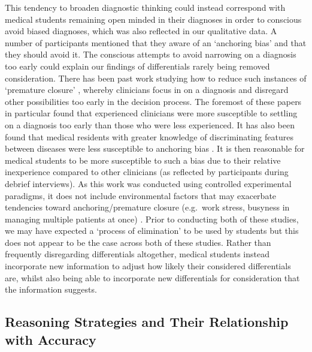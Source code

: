 \documentclass[a4paper, nobind]{templates/ociamthesis}
\begin{document}
This tendency to broaden diagnostic thinking could instead correspond with medical students remaining open minded in their diagnoses in order to conscious avoid biased diagnoses, which was also reflected in our qualitative data. A number of participants mentioned that they aware of an `anchoring bias' and that they should avoid it. The conscious attempts to avoid narrowing on a diagnosis too early could explain our findings of differentials rarely being removed consideration. There has been past work studying how to reduce such instances of `premature closure' \autocite{voytovich_premature_1985,eva_difficulty_2006,krupat_avoiding_2017}, whereby clinicians focus in on a diagnosis and disregard other possibilities too early in the decision process. The foremost of these papers in particular found that experienced clinicians were more susceptible to settling on a diagnosis too early than those who were less experienced. It has also been found that medical residents with greater knowledge of discriminating features between diseases were less susceptible to anchoring bias \autocite{mamede_role_2024}. It is then reasonable for medical students to be more susceptible to such a bias due to their relative inexperience compared to other clinicians (as reflected by participants during debrief interviews). As this work was conducted using controlled experimental paradigms, it does not include environmental factors that may exacerbate tendencies toward anchoring/premature closure (e.g.~work stress, busyness in managing multiple patients at once) \autocite{gupta_associations_2023}. Prior to conducting both of these studies, we may have expected a `process of elimination' to be used by students but this does not appear to be the case across both of these studies. Rather than frequently disregarding differentials altogether, medical students instead incorporate new information to adjust how likely their considered differentials are, whilst also being able to incorporate new differentials for consideration that the information suggests.

\subsection*{Reasoning Strategies and Their Relationship with Accuracy}\label{reasoning-strategies-and-their-relationship-with-accuracy}
\end{document}
